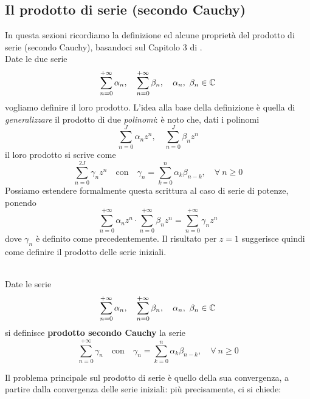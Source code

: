 \subsection{Il prodotto di serie (secondo Cauchy)}\label{prodottosecondocauchy}
In questa sezioni ricordiamo la definizione ed alcune proprietà del prodotto di serie (secondo Cauchy), basandoci sul Capitolo 3 di \cite{rudin:1976principles}.\\
Date le due serie
\begin{equation*}
	\sum_{n=0}^{+\infty} \alpha_n,\quad \sum_{n=0}^{+\infty} \beta_n,\quad \alpha_n, \ \beta_n \in \mathbb{C}
\end{equation*}
vogliamo definire il loro prodotto. L'idea alla base della definizione è quella di \textit{generalizzare} il prodotto di due \textit{polinomi}: è noto che, dati i polinomi 
\begin{equation*}
	\sum_{n=0}^{J} \alpha_n z^n,\quad \sum_{n=0}^{J} \beta_n z^n
\end{equation*}
il loro prodotto si scrive come
\begin{equation*}
	\sum_{n=0}^{2J} \gamma_n z^n\quad\text{con}\quad\gamma_n= \sum_{k=0}^{n} \alpha_k\beta_{n-k},\quad \forall \ n\geq 0
\end{equation*}
Possiamo estendere formalmente questa scrittura al caso di serie di potenze, ponendo
\begin{equation*}
	\sum_{n=0}^{+\infty} \alpha_n z^n \cdot \sum_{n=0}^{+\infty} \beta_n z^n = \sum_{n=0}^{+\infty} \gamma_n z^n
\end{equation*}
dove $\gamma_n$ è definito come precedentemente. Il risultato per $z=1$ suggerisce quindi come definire il prodotto delle serie iniziali.
\begin{define}~{}\\
	Date le serie
	\begin{equation*}
		\sum_{n=0}^{+\infty} \alpha_n,\quad \sum_{n=0}^{+\infty} \beta_n,\quad \alpha_n, \ \beta_n \in \mathbb{C}
	\end{equation*}
si definisce \textbf{prodotto secondo Cauchy} la serie
\begin{equation*}
	\sum_{n=0}^{+\infty} \gamma_n\quad\text{con}\quad\gamma_n= \sum_{k=0}^{n} \alpha_k\beta_{n-k},\quad \forall \ n\geq 0
\end{equation*}
\end{define}
Il problema principale sul prodotto di serie è quello della sua convergenza, a partire dalla convergenza delle serie iniziali: più precisamente, ci si chiede:
